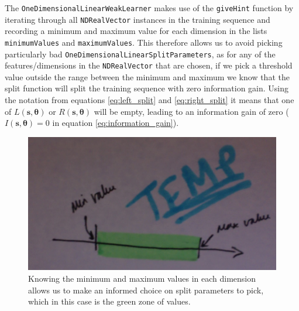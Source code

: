 \documentclass[12pt,twoside,notitlepage]{report}
\newcommand{\vc}[1]{\mathbf{#1}}
\begin{document}
                The \texttt{OneDimensionalLinearWeakLearner} makes use of the \texttt{giveHint} function by iterating through 
                all \texttt{NDRealVector} instances in the training sequence and recording a minimum and maximum value 
                for each dimension in the lists \texttt{minimumValues} and \texttt{maximumValues}. This therefore 
                allows us to avoid picking particularly bad \texttt{OneDimensionalLinearSplitParameters}, 
                as for any of the features/dimensions in the \texttt{NDRealVector} 
                that are chosen, if we pick a threshold value outside the range between the minimum and maximum we know that 
                the split function will split the training sequence with zero information gain. Using the notation from 
                equations \ref{eq:left_split} and \ref{eq:right_split} it means that one of $L(\vc{s},\vc{\theta})$ or 
                $R(\vc{s},\vc{\theta})$ will be empty, leading to an information gain of zero ($I(\vc{s},\vc{\theta}) = 0$ 
                in equation \ref{eq:information_gain}).

                \begin{figure}[H]
                  \centering
                  \includegraphics[scale=0.25]{one_dimensional_weak_learner_optimisation}
                  \caption{Knowing the minimum and maximum values in each dimension allows us to make an informed 
                  choice on split parameters to pick, which in this case is the green zone of values.}
                  \label{fig:split_parameter_choice_optimisation}
                \end{figure}
\end{document}
